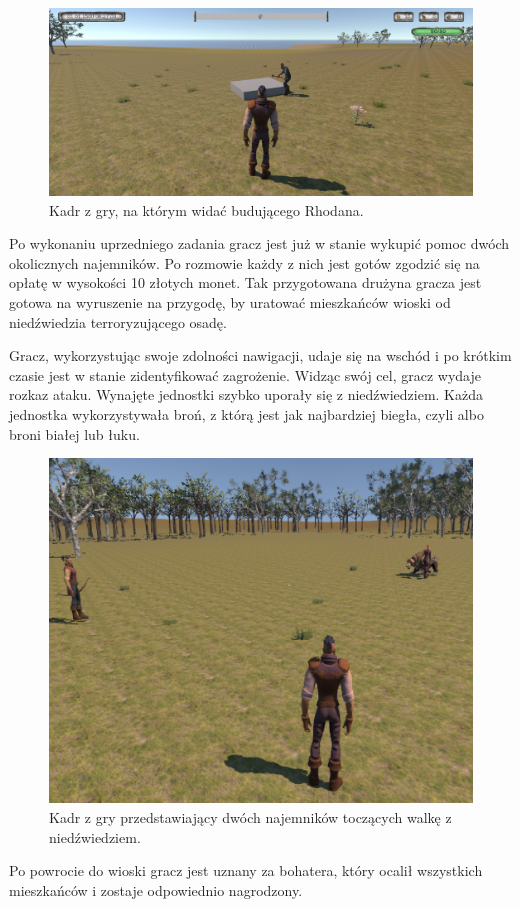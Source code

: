 \begin{figure}[h!]
    \centering
    \includegraphics[width=1\textwidth]{images/rozgrywka/rhodan9.png}
    \caption{Kadr z gry, na którym widać budującego Rhodana.}
\end{figure}

Po wykonaniu uprzedniego zadania gracz jest już w stanie wykupić pomoc dwóch okolicznych
najemników. Po rozmowie każdy z nich jest gotów zgodzić się na opłatę w wysokości 10 złotych monet.
Tak przygotowana drużyna gracza jest gotowa na wyruszenie na przygodę, by uratować
mieszkańców wioski od niedźwiedzia terroryzującego osadę.

Gracz, wykorzystując swoje zdolności nawigacji, udaje się na wschód i po krótkim czasie jest w stanie zidentyfikować zagrożenie.
Widząc swój cel, gracz wydaje rozkaz ataku. Wynajęte jednostki szybko uporały się z niedźwiedziem. Każda jednostka wykorzystywała
broń, z którą jest jak najbardziej biegła, czyli albo broni białej lub łuku.

\begin{figure}[h]
\centering
\includegraphics[width=1\textwidth]{images/fight}
\caption{Kadr z gry przedstawiający dwóch najemników toczących walkę z niedźwiedziem.}
\end{figure}

Po powrocie do wioski gracz jest uznany za bohatera, który ocalił wszystkich mieszkańców i zostaje odpowiednio nagrodzony.

